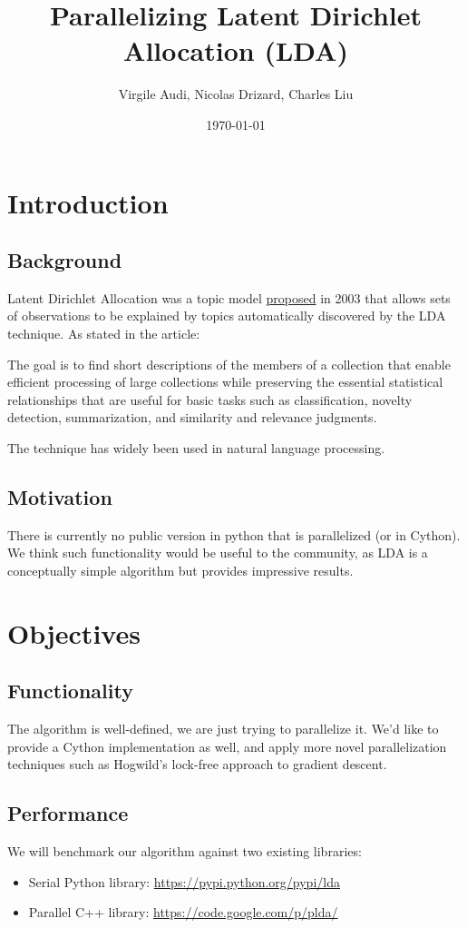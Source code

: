 \documentclass{article}
\title{Parallelizing Latent Dirichlet Allocation (LDA)}
\author{Virgile Audi, Nicolas Drizard, Charles Liu}
\date{\today}
\begin{document}
 
\maketitle
 
\section{Introduction}
	\subsection{Background}
		Latent Dirichlet Allocation was a topic model \href{https://www.cs.princeton.edu/~blei/papers/BleiNgJordan2003.pdf}{proposed} in 2003 that allows sets of observations to be explained by topics automatically discovered by the LDA technique. As stated in the article:

		\begin{displayquote}
			The goal is to find short descriptions of the members of a collection that enable efficient
			processing of large collections while preserving the essential statistical relationships that are useful
			for basic tasks such as classification, novelty detection, summarization, and similarity and relevance
			judgments.
		\end{displayquote}

		The technique has widely been used in natural language processing.

	\subsection{Motivation}
		There is currently no public version in python that is parallelized (or in Cython). We think such functionality would be useful to the community, as LDA is a conceptually simple algorithm but provides impressive results.
 
\section{Objectives}
	\subsection{Functionality}
		The algorithm is well-defined, we are just trying to parallelize it. We'd like to provide a Cython implementation as well, and apply more novel parallelization techniques such as Hogwild's lock-free approach to gradient descent.

	\subsection{Performance}
		We will benchmark our algorithm against two existing libraries:
		\begin{itemize}
			\item Serial Python library: \url{https://pypi.python.org/pypi/lda}
			\item Parallel C++ library: \url{https://code.google.com/p/plda/}
		\end{itemize}
\end{document}
